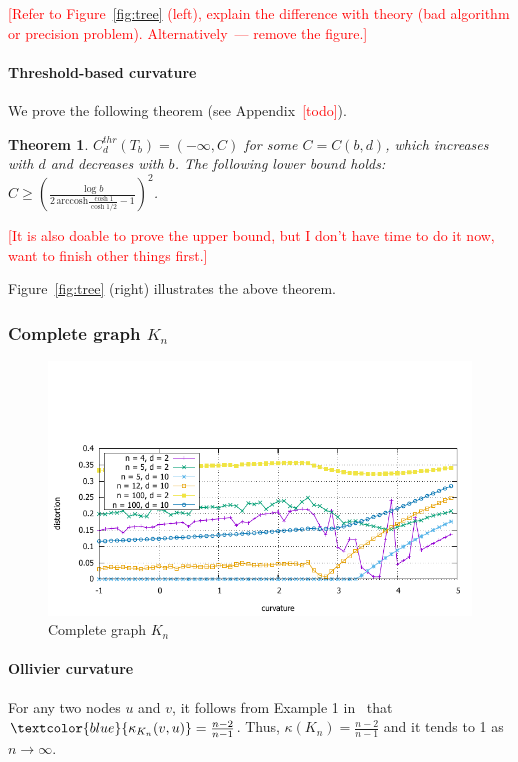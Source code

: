 \documentclass{article} %
\newtheorem{theorem}{Theorem}[section]
\newcommand{\ph}[1]{\textcolor{blue}{#1}}
\begin{document}
\textcolor{red}{[Refer to Figure~\ref{fig:tree} (left), explain the difference with theory (bad algorithm or precision problem). Alternatively~--- remove the figure.]}

\paragraph{Threshold-based curvature} 

We prove the following theorem (see Appendix~\textcolor{red}{[todo]}).

\begin{theorem}\label{thm:tree_threshold}
$C_d^{thr}(T_b) = (-\infty, C)$ for some $C = C(b,d)$, which increases with $d$ and decreases with $b$. 
The following lower bound holds: $C \ge \left( \frac{\log b}{2 \, \mathrm{arccosh} \frac{\cosh 1}{\cosh 1/2} - 1} \right)^2$.
\end{theorem}

\textcolor{red}{[It is also doable to prove the upper bound, but I don't have time to do it now, want to finish other things first.]}

Figure~\ref{fig:tree} (right) illustrates the above theorem.

\subsubsection{Complete graph $K_n$}

\begin{figure}
    \centering
    \includegraphics[width = 0.8 \textwidth]{clique_distortion.pdf}
    \caption{Complete graph $K_n$}
    \label{fig:clique}
\end{figure}

\paragraph{Ollivier curvature}  
For any two nodes $u$ and $v$, it follows from Example 1 in~\citep{jost2014ollivier} that $\ph{\kappa_{K_n}(v, u)} = \frac{n-2}{n-1}$. Thus, $\kappa(K_n) = \frac{n-2}{n-1}$ and it tends to 1 as $n \to \infty$.
\end{document}
